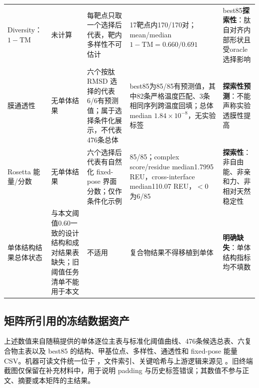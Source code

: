 \begin{landscape}
\begin{longtable}{L{29mm}L{43mm}L{51mm}L{52mm}L{40mm}}
Diversity：$1-\mathrm{TM}$
& 未计算
& 每靶点只取一个选择后代表，靶内多样性不可估计
& 17靶点内170/170对；mean/median $1-\mathrm{TM}=0.660/0.691$
& best85\textbf{探索性}：肽自对齐内部形状且受oracle选择影响 \\

膜通透性
& 无单体结果
& 六个按肽 RMSD 选择的代表6/6有预测值；属于选择条件化展示，不代表476条总体
& best85为85/85有预测值，其中82条严格温度匹配、3条相同序列跨温度回填；总体 median $1.84\times10^{-8}$，无实验标签
& \textbf{探索性预测}：不能声称实验透膜性提高 \\

Rosetta 能量/分数
& 无单体结果
& 六个选择后代表有自然化 fixed-pose 界面分数；仅作条件化示例
& 85/85；complex score/residue median1.7995 REU，cross-interface median110.07 REU，$<0$ 为6/85
& \textbf{探索性}：非自由能、非亲和力、非相对天然稳定性 \\

单体结构结果总体状态
& 与本文阈值0.60一致的设计结构和成对结果表缺失；旧阈值任务清单不能用于本文
& 不适用
& 复合物结果不得移植到单体
& \textbf{明确缺失}：单体结构指标均不填数 \\

\end{longtable}
\endgroup
\end{landscape}

\subsection{矩阵所引用的冻结数据资产}

上述数值来自随稿提供的单体逐位主表与标准化阈值曲线、476条候选总表、六复合物主表以及 best85 的结构、甲基位点、多样性、通透性和 fixed-pose 能量 CSV。机器可读文件统一位于 ，文件索引、关键哈希与上游逻辑来源见 。旧终端截图仅保留在补充材料中，用于说明 padding 与历史标签错误；其数值不参与正文、摘要或本矩阵的主结果。
